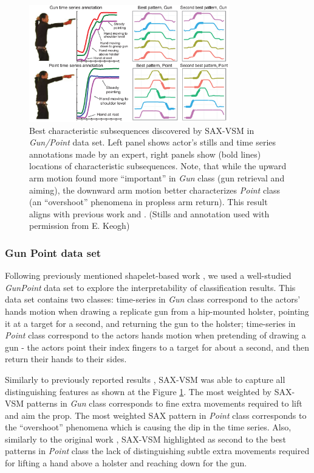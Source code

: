 \documentclass[conference]{IEEEtran}
\newcommand{\myfigureshrinker}{\vspace{0.05cm}}
\begin{document}
\begin{figure}[t]
   \myfigureshrinker
   \centering
   \includegraphics[width=87mm]{figures/gun-point.eps}
   \caption{Best characteristic subsequences discovered by SAX-VSM in \textit{Gun/Point}
   data set. 
   Left panel shows actor's stills and time series annotations made by an expert, 
   right panels show (bold lines) locations of characteristic subsequences.
   Note, that while the upward arm motion found more ``important'' in \textit{Gun} 
   class (gun retrieval and aiming), the downward arm motion better characterizes 
   \textit{Point} class (an ``overshoot'' phenomena in propless arm return). 
   This result aligns with previous work \cite{shapelet} and \cite{bagnal}.
   (Stills and annotation used with permission from E. Keogh) }
   \label{fig:shapelet-like-patterns}
\end{figure}

\subsubsection{Gun Point data set}
Following previously mentioned shapelet-based work \cite{shapelet, bagnal}, 
we used a well-studied \textit{GunPoint} data set \cite{gun} to explore the 
interpretability of classification results. This data set contains two classes: 
time-series in \textit{Gun} class correspond to the actors' hands motion when drawing
a replicate gun from a hip-mounted holster, pointing it at a target for a second,
and returning the gun to the holster; 
time-series in \textit{Point} class correspond to the actors hands motion when pretending
of drawing a gun - the actors point their index fingers to a target for about a second, 
and then return their hands to their sides. 

Similarly to previously reported results \cite{shapelet, bagnal}, 
SAX-VSM was able to capture all distinguishing features as shown at the 
Figure \ref{fig:shapelet-like-patterns}. The most weighted by SAX-VSM patterns in 
\textit{Gun} class corresponds to fine extra movements required to lift and aim the prop. 
The most weighted SAX pattern in \textit{Point} class corresponds to the ``overshoot''
phenomena which is causing the dip in the time series. 
Also, similarly to the original work \cite{gun}, SAX-VSM highlighted as second to the best
patterns in \textit{Point} class the lack of distinguishing subtle extra movements required
for lifting a hand above a holster and reaching down for the gun.
\end{document}
